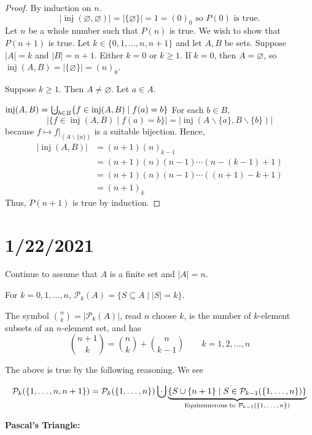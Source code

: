 \documentclass{article}
\DeclareMathOperator{\inj}{inj}
\newcommand{\bigcupdot}{\mathop{\mathchoice{\hspace{0.45em}}{\hspace{0.35em}}{}{}\cdot\mathchoice{\hspace{-0.85em}}{\hspace{-0.725em}}{}{}\bigcup\limits}}
\newcommand{\p}[1]{\left(#1\right)} %
\theoremstyle{definition}
\begin{document}
\begin{proof}
    By induction on $n$. 
    $$|\inj(\varnothing,\varnothing)|=|\{\varnothing\}| = 1 = (0)_0\text{ so }P(0)\text{ is true.}$$
    Let $n$ be a whole number such that $P(n)$ is true. We wish to show that $P(n + 1)$ is true. 
    Let $k\in\{0,1,\dots,n, n+1\}$ and let $A, B$ be sets. Suppose $|A| = k$ and $|B| = n + 1$. Either $k = 0$ or $k\geq1$. If $k = 0$, then $A=\varnothing$, so $\inj(A,B) = |\{\varnothing\}| = (n)_0$. 
    
    \vspace{2mm}
    
    Suppose $k\geq1$. Then $A\neq\varnothing$. Let $a\in A$. 
    
    $\inj(A,B) = \bigcupdot_{b\in B} \{f \in \inj(A,B) \mid f(a) = b\}$
    For each $b\in B$, $$|\{f \in \inj(A,B) \mid f(a) = b\}| = |\inj(A\backslash \{a\}, B \backslash \{b\})|$$ because $f \mapsto f|_{\p{A \backslash \{a\}}}$ is a suitable bijection. Hence, 
    \begin{align*}
        |\inj(A,B)| &= (n+1) (n)_{k-1} \\&= (n+1)(n)(n-1) \cdots (n - (k-1)+ 1) \\&= (n+1)(n)(n-1) \cdots ((n+1) - k +1) \\&= (n+1)_k
    \end{align*}
    Thus, $P(n+1)$ is true by induction.
 \end{proof}
 
\section*{1/22/2021}

Continue to assume that $A$ is a finite set and $|A| = n$.

For $k = 0, 1, \dots, n$, $\mathcal{P}_k(A) = \{S\subseteq A \mid |S| = k\}$.

The symbol $\binom{n}{k} = |\mathcal{P}_k(A)|$, read $n$ choose $k$, is the number of $k$-element subsets of an $n$-element set, and has
$$\binom{n+1}{k} = \binom{n}{k} + \binom{n}{k - 1} \quad \quad k = 1,2, \dots, n$$

The above is true by the following reasoning. We see 

$$\mathcal{P}_k(\{1,\dots,n, n + 1\}) = \mathcal{P}_k(\{1,\dots,n\})\bigcupdot\underbrace{\{S\cup\{n + 1\}\mid S \in \mathcal{P}_{k - 1}(\{1,\dots,n\})\}}_{\text{Equinumerous to $\mathcal{P}_{k - 1}(\{1,\dots,n\})$}}$$

\begin{center}\textbf{Pascal's Triangle:}\\
\end{center}
\end{document}
